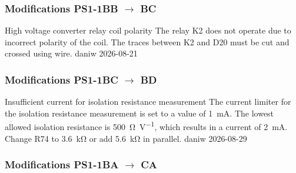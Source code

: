 \FloatBarrier

\subsubsection{Modifications PS1-1BB $\to$ BC}

\begin{ModTable}

\ModItemDone
{High voltage converter relay coil polarity}
{The relay K2 does not operate due to incorrect polarity of the coil. }
{The traces between K2 and D20 must be cut and crossed using wire. }
{daniw}
{2026-08-21}

\end{ModTable}

\FloatBarrier

\subsubsection{Modifications PS1-1BC $\to$ BD}

\begin{ModTable}

\ModItemDone
{Insufficient current for isolation resistance measurement}
{The current limiter for the isolation resistance measurement is set to a value of \qty{1}{\milli\ampere}. The lowest allowed isolation resistance is \qty{500}{\ohm\per\volt}, which results in a current of \qty{2}{\milli\ampere}. }
{Change R74 to \qty{3.6}{\kilo\ohm} or add \qty{5.6}{\kilo\ohm} in parallel. }
{daniw}
{2026-08-29}

\end{ModTable}

\FloatBarrier

\subsubsection{Modifications PS1-1BA $\to$ CA}

